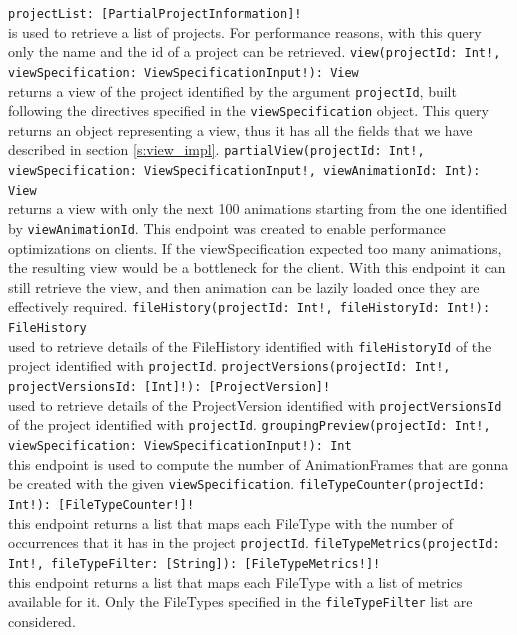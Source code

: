 \texttt{projectList:  [PartialProjectInformation]!} \\ 
is used to retrieve a list of projects. For performance reasons, with this query only the name and the id of a project can be retrieved. 
\bigbreak
\texttt{view(projectId: Int!, viewSpecification: ViewSpecificationInput!): View} \\
returns a view of the project identified by the argument \texttt{projectId}, built following the directives specified in the \texttt{viewSpecification} object. 
This query returns an object representing a view, thus it has all the fields that we have described in section \ref{s:view_impl}. 
\bigbreak
\texttt{partialView(projectId: Int!, viewSpecification: ViewSpecificationInput!, viewAnimationId: Int): View} \\
returns a view with only the next 100 animations starting from the one identified by \texttt{viewAnimationId}. 
This endpoint was created to enable performance optimizations on clients. If the viewSpecification expected too many animations, the resulting view would be a bottleneck for the client.
With this endpoint it can still retrieve the view, and then animation can be lazily loaded once they are effectively required. 
\bigbreak
\texttt{fileHistory(projectId: Int!, fileHistoryId: Int!): FileHistory} \\
used to retrieve details of the FileHistory identified with \texttt{fileHistoryId} of the project identified with \texttt{projectId}.
\bigbreak
\texttt{projectVersions(projectId: Int!, projectVersionsId: [Int]!): [ProjectVersion]!} \\
used to retrieve details of the ProjectVersion identified with \texttt{projectVersionsId} of the project identified with \texttt{projectId}.
\bigbreak
\texttt{groupingPreview(projectId: Int!, viewSpecification: ViewSpecificationInput!): Int} \\
this endpoint is used to compute the number of AnimationFrames that are gonna be created with the given \texttt{viewSpecification}.
\bigbreak
\texttt{fileTypeCounter(projectId: Int!): [FileTypeCounter!]!} \\
this endpoint returns a list that maps each FileType with the number of occurrences that it has in the project \texttt{projectId}.
\bigbreak
\texttt{fileTypeMetrics(projectId: Int!, fileTypeFilter: [String]): [FileTypeMetrics!]!} \\
this endpoint returns a list that maps each FileType with a list of metrics available for it. Only the FileTypes specified in the \texttt{fileTypeFilter} list are considered. 



